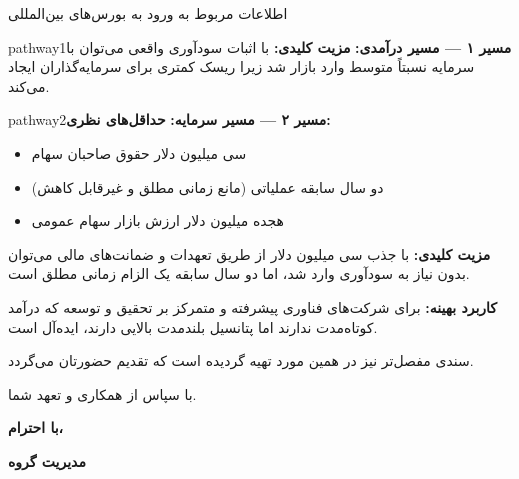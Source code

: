 \documentclass[10pt]{report}
\begin{document}
\begin{mainbox}{اطلاعات مربوط به ورود به بورس‌های بین‌المللی}
\begin{pathwaybox}{pathway1}{\textbf{مسیر ۱ — مسیر درآمدی:}}
\textbf{مزیت کلیدی:} با اثبات سودآوری واقعی می‌توان با سرمایه نسبتاً متوسط وارد بازار شد زیرا ریسک کمتری برای سرمایه‌گذاران ایجاد می‌کند.
\end{pathwaybox}

\vspace{1em}

\begin{pathwaybox}{pathway2}{\textbf{مسیر ۲ — مسیر سرمایه:}}
\textbf{حداقل‌های نظری:}
\begin{itemize}[label={\textcolor{accentBlue}{\textbullet}}]
  \item سی میلیون دلار حقوق صاحبان سهام
  \item دو سال سابقه عملیاتی (مانع زمانی مطلق و غیرقابل کاهش)
  \item هجده میلیون دلار ارزش بازار سهام عمومی
\end{itemize}

\textbf{مزیت کلیدی:} با جذب سی میلیون دلار از طریق تعهدات و ضمانت‌های مالی می‌توان بدون نیاز به سودآوری وارد شد، اما دو سال سابقه یک الزام زمانی مطلق است.

\textbf{کاربرد بهینه:} برای شرکت‌های فناوری پیشرفته و متمرکز بر تحقیق و توسعه که درآمد کوتاه‌مدت ندارند اما پتانسیل بلندمدت بالایی دارند، ایده‌آل است.
\end{pathwaybox}

\vspace{1em}

سندی مفصل‌تر نیز در همین مورد تهیه گردیده است که تقدیم حضورتان می‌گردد.

\vspace{1.5em}

\begin{center}
با سپاس از همکاری و تعهد شما.
\end{center}

\vspace{0.5em}

\begin{center}
\color{primaryBlue}\textbf{با احترام،}

\color{primaryBlue}\textbf{مدیریت گروه}
\end{center}
\end{mainbox}

\clearpage
\end{document}
